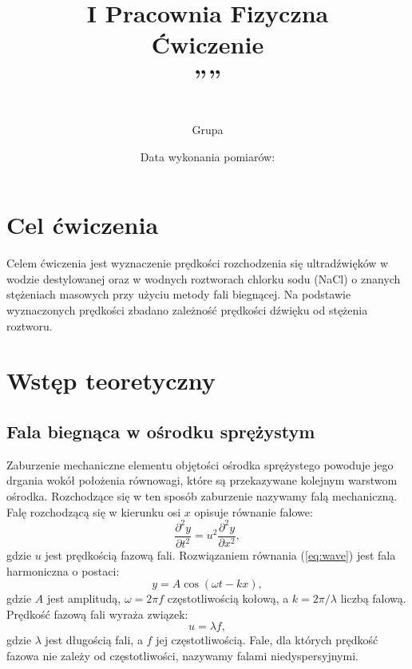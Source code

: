 \documentclass[12pt, a4paper]{article}
\title{
    \large I Pracownia Fizyczna \\[0.5em]
    \textbf{Ćwiczenie \nrCwiczenia} \\[0.3em]
    \LARGE \tytul\space''\codeword''
}
\author{
    \autor\\
     Grupa \nrGrupy}
\date{
    Data wykonania pomiarów: \dataWykonania\\
}
\begin{document}

\maketitle
\thispagestyle{empty}
\newpage

\section{Cel ćwiczenia}

Celem ćwiczenia jest wyznaczenie prędkości rozchodzenia się ultradźwięków w wodzie destylowanej oraz w wodnych roztworach chlorku sodu (NaCl) o znanych stężeniach masowych przy użyciu metody fali biegnącej. Na podstawie wyznaczonych prędkości zbadano zależność prędkości dźwięku od stężenia roztworu.

\section{Wstęp teoretyczny}

\subsection{Fala biegnąca w ośrodku sprężystym}

Zaburzenie mechaniczne elementu objętości ośrodka sprężystego powoduje jego drgania wokół położenia równowagi, które są przekazywane kolejnym warstwom ośrodka. Rozchodzące się w ten sposób zaburzenie nazywamy falą mechaniczną. Falę rozchodzącą się w kierunku osi $x$ opisuje równanie falowe:
\begin{equation}
    \frac{\partial^2 y}{\partial t^2} = u^2 \frac{\partial^2 y}{\partial x^2},
    \label{eq:wave}
\end{equation}
gdzie $u$ jest prędkością fazową fali. Rozwiązaniem równania (\ref{eq:wave}) jest fala harmoniczna o postaci:
\begin{equation}
    y = A\cos(\omega t - kx),
    \label{eq:harm}
\end{equation}
gdzie $A$ jest amplitudą, $\omega = 2\pi f$ częstotliwością kołową, a $k = 2\pi/\lambda$ liczbą falową. Prędkość fazową fali wyraża związek:
\begin{equation}
    u = \lambda f,
    \label{eq:speed}
\end{equation}
gdzie $\lambda$ jest długością fali, a $f$ jej częstotliwością. Fale, dla których prędkość fazowa nie zależy od częstotliwości, nazywamy falami niedyspersyjnymi.
\end{document}

